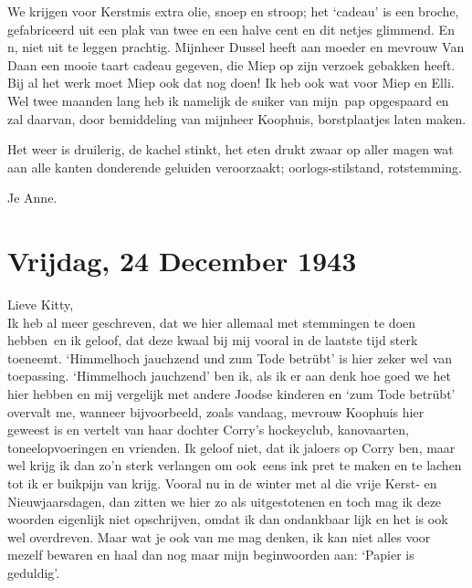 \documentclass{book}
\begin{document}
We krijgen voor Kerstmis extra olie, snoep en stroop; het `cadeau' is
een broche, gefabriceerd uit een plak van twee en een halve cent en dit
netjes glimmend. En n, niet uit te leggen prachtig. Mijnheer Dussel
heeft aan moeder en mevrouw Van Daan een mooie taart cadeau gegeven, die
Miep op zijn verzoek gebakken heeft. Bij al het werk moet Miep ook dat
nog doen! Ik heb ook wat voor Miep en Elli. Wel twee maanden lang heb ik
namelijk de suiker van mijn~pap opgespaard en zal daarvan, door
bemiddeling van mijnheer Koophuis, borstplaatjes laten maken.

Het weer is druilerig, de kachel stinkt, het eten drukt zwaar op aller
magen wat aan alle kanten donderende geluiden veroorzaakt;
oorlogs-stilstand, rotstemming.

Je Anne.

\chapter{Vrijdag, 24 December 1943}

Lieve Kitty,\\Ik heb al meer geschreven, dat we hier allemaal met
stemmingen te doen hebben~en ik geloof, dat deze kwaal bij mij vooral in
de laatste tijd sterk toeneemt. `Himmelhoch jauchzend und zum Tode
betrübt' is hier zeker wel van toepassing. `Himmelhoch jauchzend' ben
ik, als ik er aan denk hoe goed we het hier hebben en mij vergelijk met
andere Joodse kinderen en `zum Tode betrübt' overvalt me, wanneer
bijvoorbeeld, zoals vandaag, mevrouw Koophuis hier geweest is en vertelt
van haar dochter Corry's hockeyclub, kanovaarten, toneelopvoeringen en
vrienden. Ik geloof niet, dat ik jaloers op Corry ben, maar wel krijg ik
dan zo'n sterk verlangen om ook~eens ink pret te maken en te lachen tot
ik er buikpijn van krijg. Vooral nu in de winter met al die vrije Kerst-
en Nieuwjaarsdagen, dan zitten we hier zo als uitgestotenen en toch mag
ik deze woorden eigenlijk niet opschrijven, omdat ik dan ondankbaar lijk
en het is ook wel overdreven. Maar wat je ook van me mag denken, ik kan
niet alles voor mezelf bewaren en haal dan nog maar mijn beginwoorden
aan: `Papier is geduldig'.
\end{document}
